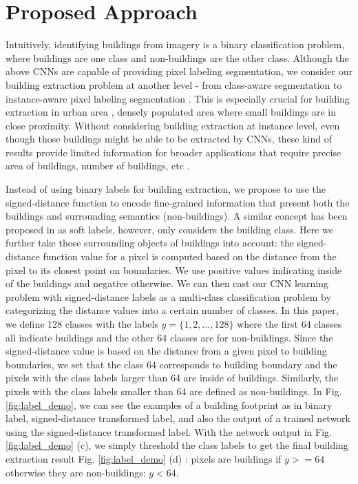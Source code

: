 \documentclass[journal]{IEEEtran}
\begin{document}
\section{Proposed Approach}
Intuitively, identifying buildings from imagery is a binary classification problem, where buildings are one class and non-buildings are the other class. Although the above CNNs are capable of providing pixel labeling segmentation, we consider our building extraction problem at another level - from class-aware segmentation to instance-aware pixel labeling segmentation \cite{silberman2014instance,WangBaiMattyusEtAl2016}. This is especially crucial for building extraction in urban area , densely populated area where small buildings are in close proximity. Without considering building extraction at instance level, even though those buildings might be able to be extracted by CNNs, these kind of results provide limited information for broader applications that require precise area of buildings, number of buildings, etc \cite{JensenCowen1999}. 

Instead of using binary labels for building extraction, we propose to use the signed-distance function \cite{Yuan2018} to encode fine-grained information that present both the buildings and surrounding semantics (non-buildings). A similar concept has been proposed in \cite{Mnih2013} as soft labels, however, only considers the building class. Here we further take those surrounding objects of buildings into account: the signed-distance function value for a pixel is computed based on the distance from the pixel to its closest point on boundaries. We use positive values indicating inside of the buildings and negative otherwise. We can then cast our CNN learning problem with signed-distance labels as a multi-class classification problem by categorizing the distance values into a certain number of classes. In this paper, we define 128 classes with the labels $y=\{1,2,\dots,128\}$ where the first 64 classes all indicate buildings and the other 64 classes are for non-buildings. Since the signed-distance value is based on the distance from a given pixel to building boundaries, we set that the class 64 corresponds to building boundary and the pixels with the class labels larger than 64 are inside of buildings. Similarly, the pixels with the class labels smaller than 64 are defined as non-buildings. In Fig. \ref{fig:label_demo}, we can see the examples of a building footprint as in binary label, signed-distance transformed label, and also the output of a trained network using the signed-distance transformed label. With the network output in Fig. \ref{fig:label_demo} (c), we simply threshold the class labels to get the final building extraction result Fig. \ref{fig:label_demo} (d) :
pixels are buildings if $y>=64$ otherwise they are non-buildings: $y<64$.    
\end{document}
